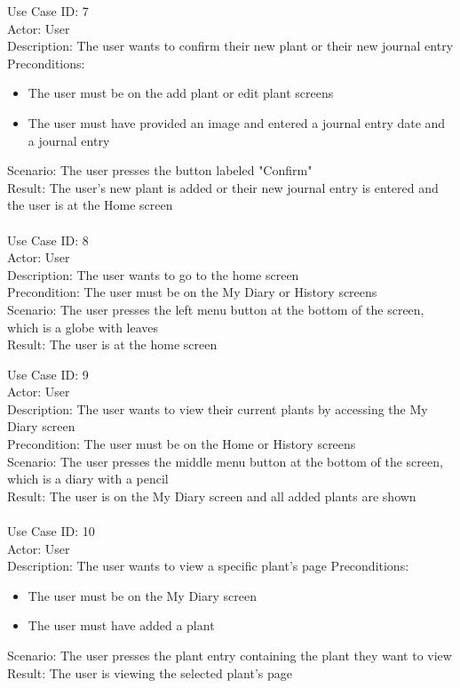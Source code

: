 \documentclass{sigchi}
\begin{document}
Use Case ID: 7 \\
Actor: User \\
Description: The user wants to confirm their new plant or their new journal entry \\
Preconditions: \begin{itemize}
    \item The user must be on the add plant or edit plant screens 
    \item The user must have provided an image and entered a journal entry date and a journal entry
\end{itemize}
Scenario: The user presses the button labeled "Confirm" \\
Result: The user's new plant is added or their new journal entry is entered and the user is at the Home screen \\
\\

Use Case ID: 8 \\
Actor: User \\
Description: The user wants to go to the home screen \\
Precondition: The user must be on the My Diary or History screens \\
Scenario: The user presses the left menu button at the bottom of the screen, which is a globe with leaves \\
Result: The user is at the home screen

Use Case ID: 9 \\
Actor: User \\
Description: The user wants to view their current plants by accessing the My Diary screen \\
Precondition: The user must be on the Home or History screens \\
Scenario: The user presses the middle menu button at the bottom of the screen, which is a diary with a pencil \\
Result: The user is on the My Diary screen and all added plants are shown \\
\\

Use Case ID: 10 \\
Actor: User \\
Description: The user wants to view a specific plant's page
Preconditions: \begin{itemize}
    \item The user must be on the My Diary screen
    \item The user must have added a plant
\end{itemize}
Scenario: The user presses the plant entry containing the plant they want to view \\
Result: The user is viewing the selected plant's page \\
\\
\end{document}
